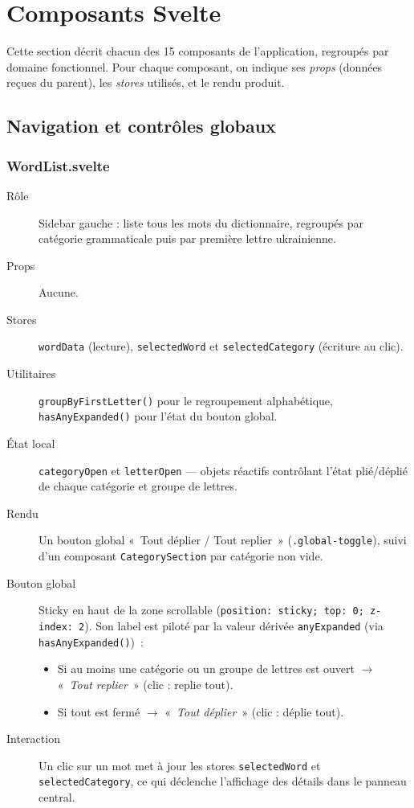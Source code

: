 \section{Composants Svelte}

Cette section décrit chacun des 15 composants de l'application, regroupés par domaine fonctionnel. Pour chaque composant, on indique ses \emph{props} (données reçues du parent), les \emph{stores} utilisés, et le rendu produit.

\subsection{Navigation et contrôles globaux}

\subsubsection{WordList.svelte}

\begin{description}
  \item[Rôle] Sidebar gauche : liste tous les mots du dictionnaire, regroupés par catégorie grammaticale puis par première lettre ukrainienne.
  \item[Props] Aucune.
  \item[Stores] \texttt{wordData} (lecture), \texttt{selectedWord} et \texttt{selectedCategory} (écriture au clic).
  \item[Utilitaires] \texttt{groupByFirstLetter()} pour le regroupement alphabétique, \texttt{hasAnyExpanded()} pour l'état du bouton global.
  \item[État local] \texttt{categoryOpen} et \texttt{letterOpen} --- objets réactifs contrôlant l'état plié/déplié de chaque catégorie et groupe de lettres.
  \item[Rendu] Un bouton global «~Tout déplier / Tout replier~» (\texttt{.global-toggle}), suivi d'un composant \texttt{CategorySection} par catégorie non vide.
  \item[Bouton global] Sticky en haut de la zone scrollable (\texttt{position: sticky; top: 0; z-index: 2}). Son label est piloté par la valeur dérivée \texttt{anyExpanded} (via \texttt{hasAnyExpanded()})~:
  \begin{itemize}
    \item Si au moins une catégorie ou un groupe de lettres est ouvert $\rightarrow$ «~\emph{Tout replier}~» (clic : replie tout).
    \item Si tout est fermé $\rightarrow$ «~\emph{Tout déplier}~» (clic : déplie tout).
  \end{itemize}
  \item[Interaction] Un clic sur un mot met à jour les stores \texttt{selectedWord} et \texttt{selectedCategory}, ce qui déclenche l'affichage des détails dans le panneau central.
\end{description}

